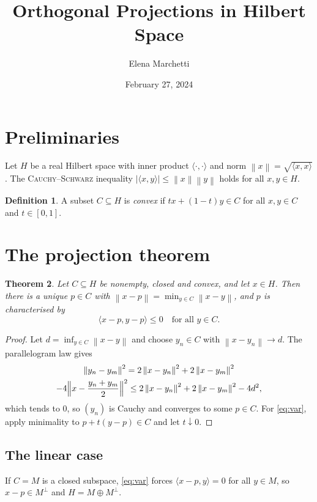 \documentclass[11pt,a4paper]{article}
\title{Orthogonal Projections in Hilbert Space}
\author{Elena Marchetti}
\date{February 27, 2024}
\newtheorem{theorem}{Theorem}
\theoremstyle{definition}
\newtheorem{definition}[theorem]{Definition}
\newcommand{\norm}[1]{\left\lVert #1\right\rVert}
\newcommand{\inner}[2]{\langle #1,#2\rangle}
\begin{document}
\maketitle
\tableofcontents

\section{Preliminaries}
Let $H$ be a real Hilbert space with inner product $\inner{\cdot}{\cdot}$ and norm $\norm{x}=\sqrt{\inner{x}{x}}$. The \textsc{Cauchy--Schwarz} inequality $|\inner{x}{y}|\le\norm{x}\norm{y}$ holds for all $x,y\in H$.

\begin{definition}
A subset $C\subseteq H$ is \emph{convex} if $tx+(1-t)y\in C$ for all $x,y\in C$ and $t\in[0,1]$.
\end{definition}

\section{The projection theorem}
\begin{theorem}\label{thm:proj}
Let $C\subseteq H$ be nonempty, closed and convex, and let $x\in H$. Then there is a unique $p\in C$ with $\norm{x-p}=\min_{y\in C}\norm{x-y}$, and $p$ is characterised by
\begin{equation}\label{eq:var}
  \inner{x-p}{y-p}\le0\quad\text{for all } y\in C.
\end{equation}
\end{theorem}

\begin{proof}
Let $d=\inf_{y\in C}\norm{x-y}$ and choose $y_n\in C$ with $\norm{x-y_n}\to d$. The parallelogram law gives
\begin{multline*}
  \norm{y_n-y_m}^2 = 2\norm{x-y_n}^2+2\norm{x-y_m}^2\\
  - 4\Bigl\lVert x-\frac{y_n+y_m}{2}\Bigr\rVert^2 \le 2\norm{x-y_n}^2+2\norm{x-y_m}^2-4d^2 ,
\end{multline*}
which tends to $0$, so $(y_n)$ is Cauchy and converges to some $p\in C$. For \eqref{eq:var}, apply minimality to $p+t(y-p)\in C$ and let $t\downarrow0$.
\end{proof}

\subsection{The linear case}
If $C=M$ is a closed subspace, \eqref{eq:var} forces $\inner{x-p}{y}=0$ for all $y\in M$, so $x-p\in M^\perp$ and $H=M\oplus M^\perp$.
\end{document}
